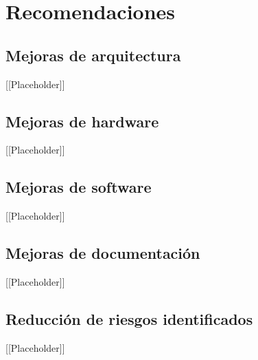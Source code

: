 \chapter{Recomendaciones}

\section{Mejoras de arquitectura}
[[Placeholder]]

\section{Mejoras de hardware}
[[Placeholder]]

\section{Mejoras de software}
[[Placeholder]]

\section{Mejoras de documentación}
[[Placeholder]]

\section{Reducción de riesgos identificados}
[[Placeholder]]
